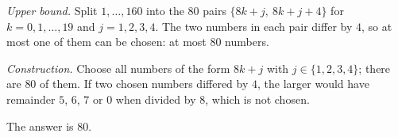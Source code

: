 \emph{Upper bound.} Split $1,\dots,160$ into the $80$ pairs $\{8k+j,\ 8k+j+4\}$ for $k=0,1,\dots,19$ and $j=1,2,3,4$. The two numbers in each pair differ by $4$, so at most one of them can be chosen: at most $80$ numbers.

\emph{Construction.} Choose all numbers of the form $8k+j$ with $j\in\{1,2,3,4\}$; there are $80$ of them. If two chosen numbers differed by $4$, the larger would have remainder $5$, $6$, $7$ or $0$ when divided by $8$, which is not chosen.

The answer is $\boxed{80}$.

